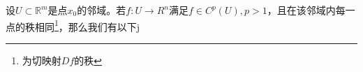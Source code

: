 
\begin{theorem}{}
设$U\subset \mathbb R^m$是点$x_0$的邻域。若$f:U\rightarrow R^n$满足$f\in C^p(U),p>1$，且在该邻域内每一点的秩相同\footnote{为切映射$Df$的秩}，那么我们有以下j
\end{theorem}
